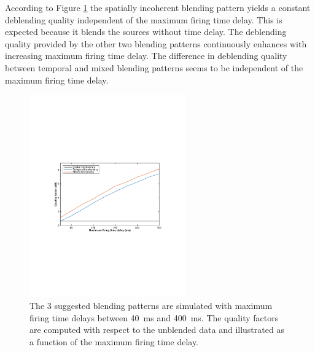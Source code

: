 According to Figure \ref{fig:Ch-Results-QualityFactors} the spatially incoherent blending pattern yields a constant deblending quality independent of the maximum firing time delay. This is expected because it blends the sources without time delay. The deblending quality provided by the other two blending patterns continuously enhances with increasing maximum firing time delay. The difference in deblending quality between temporal and mixed blending patterns seems to be independent of the maximum firing time delay.

\begin{figure}
	\centering
	\includegraphics[width = 0.6\textwidth]{Plots/BlendingPatterns/quality_line_plot_avg}
	\caption{The 3 suggested blending patterns are simulated with maximum firing time delays between \SI{40}{\milli\second} and \SI{400}{\milli\second}. The quality factors are computed with respect to the unblended data and illustrated as a function of the maximum firing time delay.}
	\label{fig:Ch-Results-QualityFactors}
\end{figure}

			

